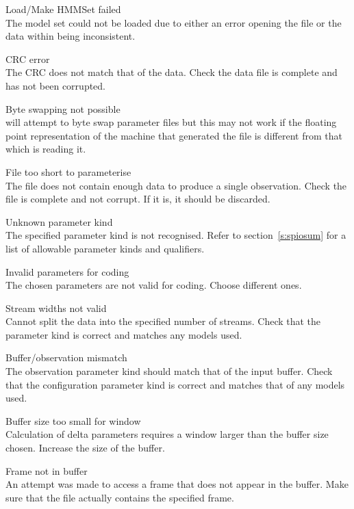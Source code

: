 \begin{itemize}
\begin{itemize}
    Load/Make HMMSet failed\\
        The model set could not be loaded due to either an error opening the
        file or the data within being inconsistent.

    CRC error\\
        The CRC does not match that of the data.  Check the data file is 
        complete and has not been corrupted.

    Byte swapping not possible\\
         will attempt to byte swap parameter files but this 
        may not work if the floating point representation of the machine 
        that generated the file is different from that which is reading it.

    File too short to parameterise\\
        The file does not contain enough data to produce a single observation.
        Check the file is complete and not corrupt.  If it is, it should be 
        discarded.

    Unknown parameter kind\\
        The specified parameter kind is not recognised.  Refer to 
        section~\ref{s:spiosum} for a list of allowable parameter kinds
        and qualifiers.

    Invalid parameters for coding\\
        The chosen parameters are not valid for coding.  Choose different ones.

    Stream widths not valid\\
        Cannot split the data into the specified number of streams.  Check that
        the parameter kind is correct and matches any models used.

    Buffer/observation mismatch\\
        The observation parameter kind should match that of the input buffer.
        Check that the configuration parameter kind is correct and matches 
        that of any models used.

    Buffer size too small for window\\
        Calculation of delta parameters requires a window larger than the
        buffer size chosen.  Increase the size of the buffer.

    Frame not in buffer\\
        An attempt was made to access a frame that does not appear in the 
        buffer.  Make sure that the file actually contains the specified frame.


\end{itemize}
\end{itemize}
